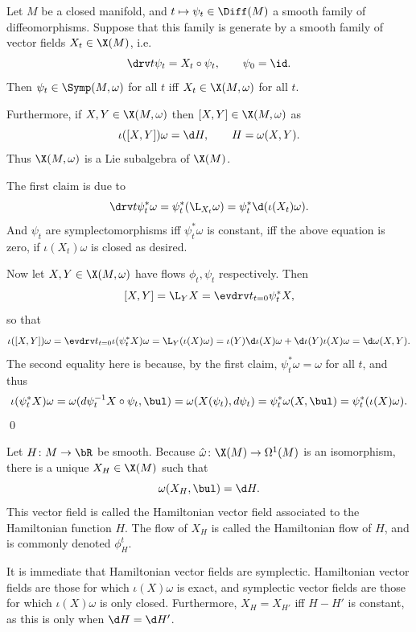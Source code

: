\bprop[name={sympflow}]

    Let $M$ be a closed manifold, and $t\mapsto\psi_t\in\Diff(M)$ a smooth family of diffeomorphisms.
    Suppose that this family is generate by a smooth family of vector fields $X_t\in\X(M)$, i.e.
    $$ \drv t\psi_t = X_t\circ\psi_t,\qquad \psi_0=\id . $$
    Then $\psi_t\in\Symp(M,\omega)$ for all $t$ iff $X_t\in\X(M,\omega)$ for all $t$.

    Furthermore, if $X,Y\in\X(M,\omega)$ then $[X,Y]\in\X(M,\omega)$ as
    $$ \iota([X,Y])\omega = \d H,\qquad H = \omega(X,Y) . $$
    Thus $\X(M,\omega)$ is a Lie subalgebra of $\X(M)$.

\eprop

\bproof

    The first claim is due to
    $$ \drv t\psi_t^*\omega = \psi_t^*(\L_{X_t}\omega) = \psi_t^*\d(\iota(X_t)\omega) . $$
    And $\psi_t$ are symplectomorphisms iff $\psi_t^*\omega$ is constant, iff the above equation is zero, if $\iota(X_t)\omega$ is closed as desired.

    Now let $X,Y\in\X(M,\omega)$ have flows $\phi_t,\psi_t$ respectively.
    Then
    $$ [X,Y] = \L_YX = \evdrv t_{t=0}\psi_t^*X , $$
    so that
    $$ \iota([X,Y])\omega = \evdrv t_{t=0}\iota(\psi_t^*X)\omega = \L_Y(\iota(X)\omega) = \iota(Y)\d\iota(X)\omega + \d\iota(Y)\iota(X)\omega = \d\omega(X,Y) . $$
    The second equality here is because, by the first claim, $\psi_t^*\omega=\omega$ for all $t$, and thus
    $$ \iota(\psi_t^*X)\omega = \omega(d\psi_t^{-1}X\circ\psi_t,\bul) = \omega(X(\psi_t),d\psi_t) = \psi_t^*\omega(X,\bul) = \psi_t^*(\iota(X)\omega) . $$
    \qed

\eproof

\bdefn

    Let $H\colon M\to\bR$ be smooth.
    Because $\hat\omega\colon\X(M)\to\Omega^1(M)$ is an isomorphism, there is a unique $X_H\in\X(M)$ such that
    $$ \omega(X_H,\bul) = \d H . $$
    This vector field is called the {\emphcolor Hamiltonian vector field} associated to the {\emphcolor Hamiltonian function} $H$.
    The flow of $X_H$ is called the {\emphcolor Hamiltonian flow} of $H$, and is commonly denoted $\phi^t_H$.

\edefn

It is immediate that Hamiltonian vector fields are symplectic.
Hamiltonian vector fields are those for which $\iota(X)\omega$ is exact, and symplectic vector fields are those for which $\iota(X)\omega$ is only closed.
Furthermore, $X_H=X_{H'}$ iff $H-H'$ is constant, as this is only when $\d H=\d H'$.

